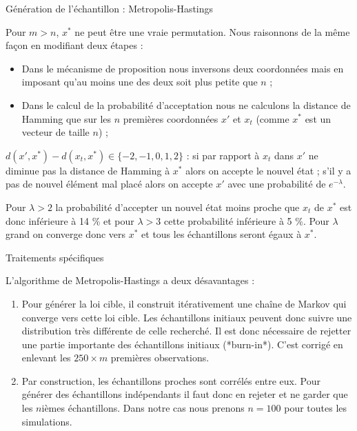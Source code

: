 \documentclass[10pt,xcolor=table,color={dvipsnames,usenames},ignorenonframetext,usepdftitle=false,french]{beamer}
\begin{document}
\begin{frame}{Génération de l'échantillon : Metropolis-Hastings}
\protect\hypertarget{guxe9nuxe9ration-de-luxe9chantillon-metropolis-hastings-1}{}

Pour \(m>n\), \(x^*\) ne peut être une vraie permutation. Nous
raisonnons de la même façon en modifiant deux étapes :

\begin{itemize}
\item Dans le mécanisme de proposition nous inversons deux coordonnées mais en imposant qu'au moins une des deux soit plus petite que $n$ ;
\item Dans le calcul de la probabilité d'acceptation nous ne calculons la distance de Hamming que sur les $n$ premières coordonnées $x'$ et $x_t$ (comme $x^*$ est un vecteur de taille $n$) ;
\end{itemize}

\(d(x',x^{*})-d(x_{t},x^{*})\in\{-2,-1,0,1,2\}\) : si par rapport à
\(x_t\) dans \(x'\) ne diminue pas la distance de Hamming à \(x^{*}\)
alors on accepte le nouvel état ; s'il y a pas de nouvel élément mal
placé alors on accepte \(x'\) avec une probabilité de \(e^{-\lambda}\).

Pour \(\lambda>2\) la probabilité d'accepter un nouvel état moins proche
que \(x_t\) de \(x^*\) est donc inférieure à 14 \% et pour \(\lambda>3\)
cette probabilité inférieure à 5 \%. Pour \(\lambda\) grand on converge
donc vers \(x^*\) et tous les échantillons seront égaux à \(x^*\).

\end{frame}

\begin{frame}{Traitements spécifiques}
\protect\hypertarget{traitements-spuxe9cifiques}{}

L'algorithme de Metropolis-Hastings a deux désavantages :

\begin{enumerate}
\item Pour générer la loi cible, il construit itérativement une chaîne de Markov qui converge vers cette loi cible. Les échantillons initiaux peuvent donc suivre une distribution très différente de celle recherché. Il est donc nécessaire de rejetter une partie importante des échantillons initiaux (*burn-in*). C'est corrigé en enlevant les $250\times m$ premières observations.
\item  Par construction, les échantillons proches sont corrélés entre eux. Pour générer des échantillons indépendants il faut donc en rejeter et ne garder que les $n$ièmes échantillons. Dans notre cas nous prenons $n=100$ pour toutes les simulations.
\end{enumerate}

\end{frame}
\end{document}
